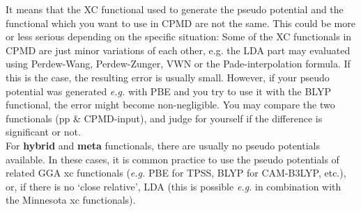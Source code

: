\documentclass[twoside,10pt,titlepage,a4paper]{article}
\newcommand{\reflabel}[1]{\hypertarget{#1}}
\newcommand{\reflabel}[1]{\label{#1}}
\newcommand{\faqquestion}[1]{\vspace{2ex}\reflabel{faq#1}{{\bf Q:\ }}}
\newcommand{\faqanswer}{\vspace{1ex}{{\bf A:\ }}}
\begin{document}
\faqanswer
It means that the XC functional used to generate the pseudo potential
and the functional which you want to use in CPMD are not the same. This
could be more or less serious depending on the specific situation:
Some of the XC functionals in CPMD are
just minor variations of each other, e.g. the LDA part may evaluated
using Perdew-Wang, Perdew-Zunger, VWN or the Pade-interpolation
formula. If this is the case, the resulting error is usually small.
However, if your pseudo potential was generated \emph{e.g.{}} with PBE
and you try to use it with the BLYP functional, the error might become
non-negligible. You may compare the two functionals (pp \& CPMD-input),
and judge for yourself if the difference is significant or not. \\
For \textbf{hybrid} and \textbf{meta} functionals, there are usually
no pseudo potentials available. In these cases, it is common practice to use
the pseudo potentials of related GGA xc functionals (\emph{e.g.{}} PBE for TPSS,
BLYP for CAM-B3LYP, etc.{}), or, if there is no `close relative', LDA
(this is possible \emph{e.g.{}} in combination with the Minnesota xc functionals).
%   
%   
%   
                
\end{document}
